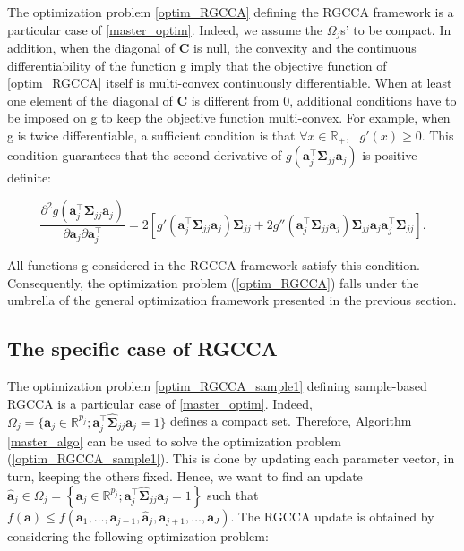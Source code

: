 \documentclass[
]{jss}
\begin{document}
The optimization problem \eqref{optim_RGCCA} defining the RGCCA
framework is a particular case of \eqref{master_optim}. Indeed, we
assume the \(\Omega_j\)s' to be compact. In addition, when the diagonal
of \(\mathbf{C}\) is null, the convexity and the continuous
differentiability of the function g imply that the objective function of
\eqref{optim_RGCCA} itself is multi-convex continuously differentiable.
When at least one element of the diagonal of \(\mathbf{C}\) is different
from \(0\), additional conditions have to be imposed on g to keep the
objective function multi-convex. For example, when g is twice
differentiable, a sufficient condition is that
\(\forall x\in\mathbb{R}_+, \text{ } g'(x)\geq 0\). This condition
guarantees that the second derivative of
\(g\left(\mathbf{a}_j^\top \mathbf{\Sigma}_{jj} \mathbf{a}_j\right)\) is
positive-definite:

\begin{equation}
\frac{\partial^2 g\left(\mathbf a_j^\top  \mathbf \Sigma_{jj} \mathbf a_j \right)}{\partial \mathbf a_j \partial \mathbf a_j^\top} = 2 \left[ g'\left( \mathbf a_j^\top  \mathbf \Sigma_{jj} \mathbf a_j \right) \mathbf \Sigma_{jj} + 2 g''\left(\mathbf a_j^\top  \mathbf \Sigma_{jj} \mathbf a_j\right)  \mathbf \Sigma_{jj}\mathbf a_j\mathbf a_j^\top \mathbf \Sigma_{jj} \right]. 
\end{equation}

All functions g considered in the RGCCA framework satisfy this
condition. Consequently, the optimization problem (\ref{optim_RGCCA})
falls under the umbrella of the general optimization framework presented
in the previous section.

\hypertarget{the-specific-case-of-rgcca}{%
\subsection{The specific case of
RGCCA}\label{the-specific-case-of-rgcca}}

The optimization problem \eqref{optim_RGCCA_sample1} defining
sample-based RGCCA is a particular case of \eqref{master_optim}. Indeed,
\(\Omega_j = \{ \mathbf a_j \in \mathbb{R}^{p_j}; \mathbf a_j^\top \widehat{\mathbf{\Sigma}}_{jj} \mathbf a_j = 1\}\)
defines a compact set. Therefore, Algorithm \ref{master_algo} can be
used to solve the optimization problem (\ref{optim_RGCCA_sample1}). This
is done by updating each parameter vector, in turn, keeping the others
fixed. Hence, we want to find an update
\(\hat{\mathbf{a}}_j\in \Omega_j=\left\lbrace \mathbf a_j \in \mathbb{R}^{p_j}; \mathbf{a}_j^\top \widehat{\mathbf{\Sigma}}_{jj} \mathbf{a}_j = 1 \right\rbrace\)
such that
\(f(\mathbf{a})\leq f(\mathbf{a}_1, \ldots, \mathbf{a}_{j-1}, \hat{\mathbf{a}}_j, \mathbf{a}_{j+1}, \ldots, \mathbf{a}_J)\).
The RGCCA update is obtained by considering the following optimization
problem:
\end{document}
